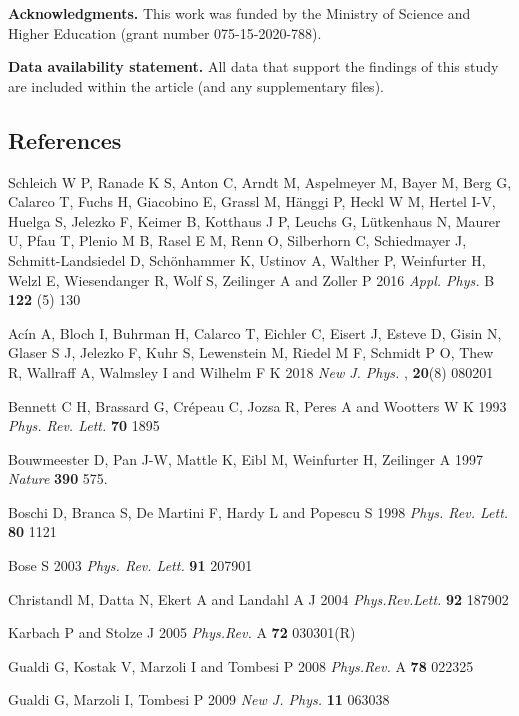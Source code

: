 \documentclass[pra,preprint,showpacs]{revtex4-1}
\begin{document}
{{{\bf Acknowledgments.} This work was funded by the Ministry of Science and Higher Education (grant number 075-15-2020-788).

{\bf Data availability statement.} All data that support the findings of this study are included within the article (and any supplementary files).

\begin{thebibliography}{99}

\section*{References}

 Schleich W P, Ranade K S, Anton C, Arndt M, Aspelmeyer M, Bayer M, Berg G, Calarco T, Fuchs H, Giacobino E, Grassl M, Hänggi P, Heckl W M, Hertel I-V, Huelga S, Jelezko F, Keimer B, Kotthaus J P, Leuchs G, Lütkenhaus N, Maurer U, Pfau T, Plenio M B, Rasel E M, Renn O, Silberhorn C, Schiedmayer J, Schmitt-Landsiedel D, Sch\"onhammer K, Ustinov A, Walther P, Weinfurter H, Welzl E, Wiesendanger R, Wolf S, Zeilinger A and Zoller P
2016  {\it Appl. Phys.} B  {\bf 122} (5) 130

 Acín A, Bloch I, Buhrman H, Calarco T, Eichler C, Eisert J, Esteve D, Gisin N, Glaser S J, Jelezko F, Kuhr S, Lewenstein M, Riedel M F, Schmidt P O, Thew R, Wallraff A, Walmsley I and Wilhelm F K
2018 {\it New J. Phys.} , {\bf 20}(8) 080201


Bennett C H,  Brassard G,  Cr\'epeau C,  Jozsa R, Peres A and  Wootters W K
1993 {\it Phys. Rev. Lett.} {\bf 70} 1895

 Bouwmeester D,  Pan J-W, Mattle  K, Eibl M,  Weinfurter H, Zeilinger A
1997 {\it Nature} {\bf 390}  575.

Boschi D, Branca S, De Martini F,  Hardy L and Popescu S
 1998 {\it Phys. Rev. Lett.} {\bf 80} 1121


Bose S
2003 {\it Phys. Rev. Lett.}
 {\bf 91}   207901

 Christandl M, Datta N, Ekert  A and Landahl A J
2004 {\it Phys.Rev.Lett.} {\bf 92}  187902

Karbach P and Stolze J
2005 {\it Phys.Rev.} A  {\bf 72} 030301(R)

Gualdi  G, Kostak V, Marzoli I and Tombesi P
2008 {\it Phys.Rev.} A {\bf 78}  022325


Gualdi G, Marzoli I, Tombesi P
2009 {\it New J. Phys.}  {\bf 11}  063038


\end{thebibliography}}}
\end{document}
